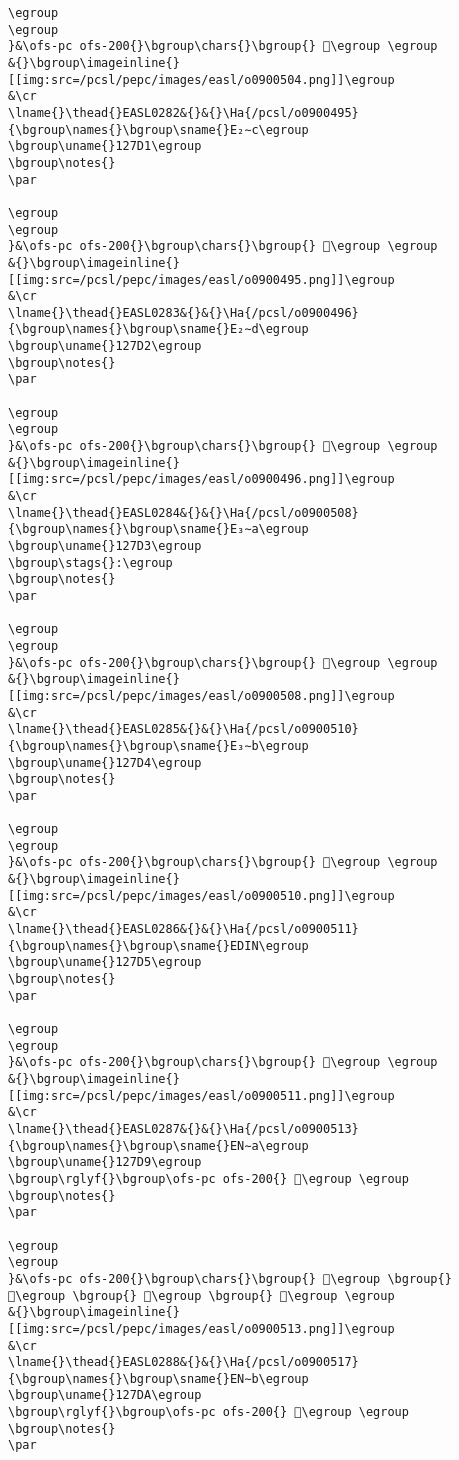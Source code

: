\begin{verbatim}
\egroup
\egroup
}&\ofs-pc ofs-200{}\bgroup\chars{}\bgroup{} 𒟐\egroup \egroup
&{}\bgroup\imageinline{}[[img:src=/pcsl/pepc/images/easl/o0900504.png]]\egroup
&\cr
\lname{}\thead{}EASL0282&{}&{}\Ha{/pcsl/o0900495}{\bgroup\names{}\bgroup\sname{}E₂∼c\egroup
\bgroup\uname{}127D1\egroup
\bgroup\notes{}
\par 

\egroup
\egroup
}&\ofs-pc ofs-200{}\bgroup\chars{}\bgroup{} 𒟑\egroup \egroup
&{}\bgroup\imageinline{}[[img:src=/pcsl/pepc/images/easl/o0900495.png]]\egroup
&\cr
\lname{}\thead{}EASL0283&{}&{}\Ha{/pcsl/o0900496}{\bgroup\names{}\bgroup\sname{}E₂∼d\egroup
\bgroup\uname{}127D2\egroup
\bgroup\notes{}
\par 

\egroup
\egroup
}&\ofs-pc ofs-200{}\bgroup\chars{}\bgroup{} 𒟒\egroup \egroup
&{}\bgroup\imageinline{}[[img:src=/pcsl/pepc/images/easl/o0900496.png]]\egroup
&\cr
\lname{}\thead{}EASL0284&{}&{}\Ha{/pcsl/o0900508}{\bgroup\names{}\bgroup\sname{}E₃∼a\egroup
\bgroup\uname{}127D3\egroup
\bgroup\stags{}:\egroup
\bgroup\notes{}
\par 

\egroup
\egroup
}&\ofs-pc ofs-200{}\bgroup\chars{}\bgroup{} 𒟓\egroup \egroup
&{}\bgroup\imageinline{}[[img:src=/pcsl/pepc/images/easl/o0900508.png]]\egroup
&\cr
\lname{}\thead{}EASL0285&{}&{}\Ha{/pcsl/o0900510}{\bgroup\names{}\bgroup\sname{}E₃∼b\egroup
\bgroup\uname{}127D4\egroup
\bgroup\notes{}
\par 

\egroup
\egroup
}&\ofs-pc ofs-200{}\bgroup\chars{}\bgroup{} 𒟔\egroup \egroup
&{}\bgroup\imageinline{}[[img:src=/pcsl/pepc/images/easl/o0900510.png]]\egroup
&\cr
\lname{}\thead{}EASL0286&{}&{}\Ha{/pcsl/o0900511}{\bgroup\names{}\bgroup\sname{}EDIN\egroup
\bgroup\uname{}127D5\egroup
\bgroup\notes{}
\par 

\egroup
\egroup
}&\ofs-pc ofs-200{}\bgroup\chars{}\bgroup{} 𒟕\egroup \egroup
&{}\bgroup\imageinline{}[[img:src=/pcsl/pepc/images/easl/o0900511.png]]\egroup
&\cr
\lname{}\thead{}EASL0287&{}&{}\Ha{/pcsl/o0900513}{\bgroup\names{}\bgroup\sname{}EN∼a\egroup
\bgroup\uname{}127D9\egroup
\bgroup\rglyf{}\bgroup\ofs-pc ofs-200{} 𒟙\egroup \egroup
\bgroup\notes{}
\par 

\egroup
\egroup
}&\ofs-pc ofs-200{}\bgroup\chars{}\bgroup{} 𒟖\egroup \bgroup{} 𒟗\egroup \bgroup{} 𒟘\egroup \bgroup{} 𒟙\egroup \egroup
&{}\bgroup\imageinline{}[[img:src=/pcsl/pepc/images/easl/o0900513.png]]\egroup
&\cr
\lname{}\thead{}EASL0288&{}&{}\Ha{/pcsl/o0900517}{\bgroup\names{}\bgroup\sname{}EN∼b\egroup
\bgroup\uname{}127DA\egroup
\bgroup\rglyf{}\bgroup\ofs-pc ofs-200{} 𒟚\egroup \egroup
\bgroup\notes{}
\par 


\end{verbatim}
